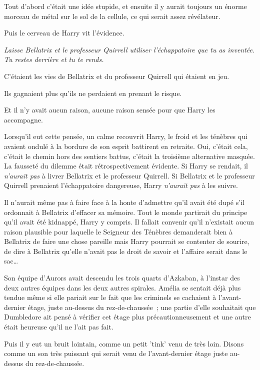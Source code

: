 Tout d'abord c'était une idée stupide, et ensuite il y aurait toujours un énorme morceau de métal sur le sol de la cellule, ce qui serait assez révélateur.

Puis le cerveau de Harry vit l'évidence.

\emph{Laisse Bellatrix et le professeur Quirrell utiliser l'échappatoire que tu as inventée. Tu restes derrière et tu te rends.}

C'étaient les vies de Bellatrix et du professeur Quirrell qui étaient en jeu.

Ils gagnaient plus qu'ils ne perdaient en prenant le risque.

Et il n'y avait aucun raison, aucune raison sensée pour que Harry les accompagne.

Lorsqu'il eut cette pensée, un calme recouvrit Harry, le froid et les ténèbres qui avaient ondulé à la bordure de son esprit battirent en retraite. Oui, c'était cela, c'était le chemin hors des sentiers battus, c'était la troisième alternative masquée. La fausseté du dilemme était rétrospectivement évidente. Si Harry se rendait, il \emph{n'aurait pas} à livrer Bellatrix et le professeur Quirrell. Si Bellatrix et le professeur Quirrell prenaient l'échappatoire dangereuse, Harry \emph{n'aurait pas} à les suivre.

Il n'aurait même pas à faire face à la honte d'admettre qu'il avait été dupé s'il ordonnait à Bellatrix d'effacer sa mémoire. Tout le monde partirait du principe qu'il avait été kidnappé, Harry y compris. Il fallait convenir qu'il n'existait aucun raison plausible pour laquelle le Seigneur des Ténèbres demanderait bien à Bellatrix de faire une chose pareille mais Harry pourrait se contenter de sourire, de dire à Bellatrix qu'elle n'avait pas le droit de savoir et l'affaire serait dans le sac…

\later

Son équipe d'Aurors avait descendu les trois quarts d'Azkaban, à l'instar des deux autres équipes dans les deux autres spirales. Amélia se sentait déjà plus tendue même si elle pariait sur le fait que les criminels se cachaient à l'avant-dernier étage, juste au-dessus du rez-de-chaussée~; une partie d'elle souhaitait que Dumbledore ait pensé à vérifier cet étage plus précautionneusement et une autre était heureuse qu'il ne l'ait pas fait.

Puis il y eut un bruit lointain, comme un petit 'tink' venu de très loin. Disons comme un son très puissant qui serait venu de l'avant-dernier étage juste au-dessus du rez-de-chaussée.


